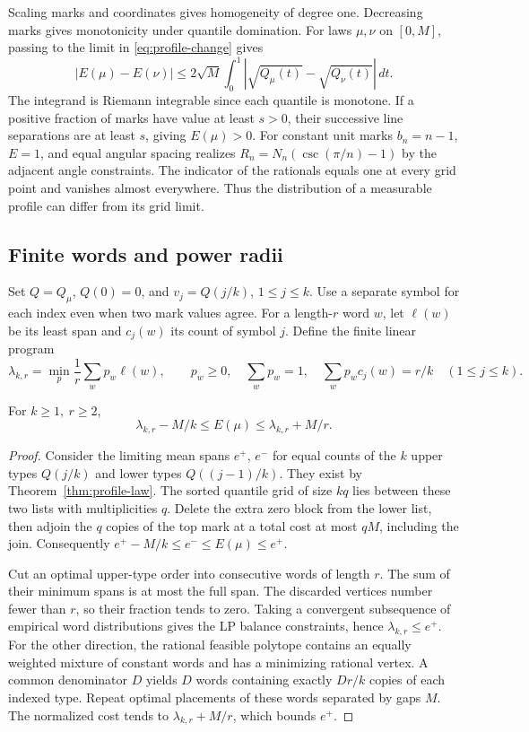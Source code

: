 Scaling marks and coordinates gives homogeneity of degree one. Decreasing
marks gives monotonicity under quantile domination. For laws \(\mu,\nu\)
on \([0,M]\), passing to the limit in \eqref{eq:profile-change} gives
\[
 |E(\mu)-E(\nu)|\le
 2\sqrt M \int_0^1 |\sqrt{Q_\mu(t)}-\sqrt{Q_\nu(t)}|\,dt .
\]
The integrand is Riemann integrable since each quantile is monotone.
If a positive fraction of marks have value at least \(s>0\), their
successive line separations are at least \(s\), giving \(E(\mu)>0\).
For constant unit marks \(b_n=n-1\), \(E=1\), and equal angular spacing
realizes \(R_n=N_n(\csc(\pi/n)-1)\) by the adjacent angle constraints.
The indicator of the rationals equals one at every grid point and vanishes
almost everywhere. Thus the distribution of a measurable profile can
differ from its grid limit.

\subsection{Finite words and power radii}

Set \(Q=Q_\mu\), \(Q(0)=0\), and \(v_j=Q(j/k)\), \(1\le j\le k\).
Use a separate symbol for each index even when two mark values agree.
For a length-\(r\) word \(w\), let \(\ell(w)\) be its least span and
\(c_j(w)\) its count of symbol \(j\). Define the finite linear program
\[
 \lambda_{k,r}=\min_p \frac1r\sum_w p_w\ell(w),\qquad
 p_w\ge0,\quad\sum_w p_w=1,\quad
 \sum_w p_w c_j(w)=r/k\quad(1\le j\le k).
\]
\begin{theorem}\label{thm:profile-words}
For \(k\ge1,\ r\ge2\),
\[
 \lambda_{k,r}-M/k\le E(\mu)\le\lambda_{k,r}+M/r.
\]
\end{theorem}
\begin{proof}
Consider the limiting mean spans \(e^+\), \(e^-\) for equal counts of
the \(k\) upper types \(Q(j/k)\) and lower types \(Q((j-1)/k)\).
They exist by Theorem~\ref{thm:profile-law}. The sorted quantile grid
of size \(kq\) lies between these two lists with multiplicities \(q\).
Delete the extra zero block from the lower list, then adjoin the \(q\)
copies of the top mark at a total cost at most \(qM\), including the join.
Consequently \(e^+-M/k\le e^-\le E(\mu)\le e^+\).

Cut an optimal upper-type order into consecutive words of length \(r\). The sum of their minimum spans is at most the full span. The discarded vertices number fewer than \(r\), so their fraction tends to zero. Taking
a convergent subsequence of empirical word distributions gives the LP
balance constraints, hence \(\lambda_{k,r}\le e^+\). For the other
direction, the rational feasible polytope contains an equally weighted
mixture of constant words and has a minimizing rational vertex. A common
denominator \(D\) yields \(D\) words containing exactly \(Dr/k\) copies
of each indexed type. Repeat optimal placements of these words separated
by gaps \(M\). The normalized cost tends to
\(\lambda_{k,r}+M/r\), which bounds \(e^+\).
\end{proof}

